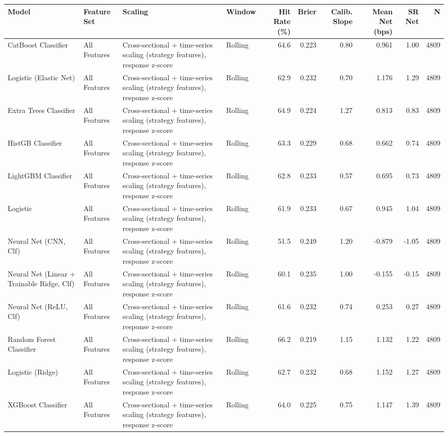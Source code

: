 \begin{tabular}{llllrrrrrr}
\toprule
Model & Feature Set & Scaling & Window & Hit Rate (\%) & Brier & Calib. Slope & Mean Net (bps) & SR Net & N \\
\midrule
CatBoost Classifier & All Features & Cross-sectional + time-series scaling (strategy features), response z-score & Rolling & 64.6 & 0.223 & 0.80 & 0.961 & 1.00 & 4809 \\
Logistic (Elastic Net) & All Features & Cross-sectional + time-series scaling (strategy features), response z-score & Rolling & 62.9 & 0.232 & 0.70 & 1.176 & 1.29 & 4809 \\
Extra Trees Classifier & All Features & Cross-sectional + time-series scaling (strategy features), response z-score & Rolling & 64.9 & 0.224 & 1.27 & 0.813 & 0.83 & 4809 \\
HistGB Classifier & All Features & Cross-sectional + time-series scaling (strategy features), response z-score & Rolling & 63.3 & 0.229 & 0.68 & 0.662 & 0.74 & 4809 \\
LightGBM Classifier & All Features & Cross-sectional + time-series scaling (strategy features), response z-score & Rolling & 62.8 & 0.233 & 0.57 & 0.695 & 0.73 & 4809 \\
Logistic & All Features & Cross-sectional + time-series scaling (strategy features), response z-score & Rolling & 61.9 & 0.233 & 0.67 & 0.945 & 1.04 & 4809 \\
Neural Net (CNN, Clf) & All Features & Cross-sectional + time-series scaling (strategy features), response z-score & Rolling & 51.5 & 0.249 & 1.20 & -0.879 & -1.05 & 4809 \\
Neural Net (Linear + Trainable Ridge, Clf) & All Features & Cross-sectional + time-series scaling (strategy features), response z-score & Rolling & 60.1 & 0.235 & 1.00 & -0.155 & -0.15 & 4809 \\
Neural Net (ReLU, Clf) & All Features & Cross-sectional + time-series scaling (strategy features), response z-score & Rolling & 61.6 & 0.232 & 0.74 & 0.253 & 0.27 & 4809 \\
Random Forest Classifier & All Features & Cross-sectional + time-series scaling (strategy features), response z-score & Rolling & 66.2 & 0.219 & 1.15 & 1.132 & 1.22 & 4809 \\
Logistic (Ridge) & All Features & Cross-sectional + time-series scaling (strategy features), response z-score & Rolling & 62.7 & 0.232 & 0.68 & 1.152 & 1.27 & 4809 \\
XGBoost Classifier & All Features & Cross-sectional + time-series scaling (strategy features), response z-score & Rolling & 64.0 & 0.225 & 0.75 & 1.147 & 1.39 & 4809 \\
\bottomrule
\end{tabular}
